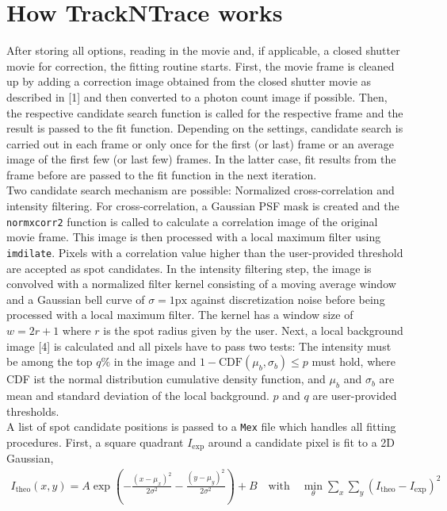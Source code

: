 \documentclass[11pt,onside]{report}
\numberwithin{equation}{chapter}
\begin{document}
\section{How TrackNTrace works}\label{sec:in-depth}
After storing all options, reading in the movie and, if applicable, a closed shutter movie for correction, the fitting routine starts. First, the movie frame is cleaned up by adding a correction image obtained from the closed shutter movie as described in [1] and then converted to a photon count image if possible. Then, the respective candidate search function is called for the respective frame and the result is passed to the fit function. Depending on the settings, candidate search is carried out in each frame or only once for the first (or last) frame or an average image of the first few (or last few) frames. In the latter case, fit results from the frame before are passed to the fit function in the next iteration. \\
Two candidate search mechanism are possible: Normalized cross-correlation and intensity filtering. For cross-correlation, a Gaussian PSF mask is created and the \texttt{normxcorr2} function is called to calculate a correlation image of the original movie frame. This image is then processed with a local maximum filter using \texttt{imdilate}. Pixels with a correlation value higher than the user-provided threshold are accepted as spot candidates. In the intensity filtering step, the image is convolved with a normalized filter kernel  consisting of a moving average window and a Gaussian bell curve of $\sigma = \unit{1}{\mathrm{px}}$ against discretization noise before being processed with a local maximum filter. The kernel has a window size of $w = 2r+1$ where $r$ is the spot radius given by the user. Next, a local background image [4] is calculated and all pixels have to pass two tests: The intensity must be among the top $q\%$ in the image and $1-\mathrm{CDF}(\mu_b,\sigma_b) \leq p$ must hold, where CDF ist the normal distribution cumulative density function, and $\mu_b$ and $\sigma_b$ are mean and standard deviation of the local background. $p$ and $q$ are user-provided thresholds.\\[10pt]
A list of spot candidate positions is passed to a \texttt{Mex} file which handles all fitting procedures. First, a square quadrant $I_\mathrm{exp}$ around a candidate pixel is fit to a 2D Gaussian,
\begin{align*}
I_\mathrm{theo}(x,y) = A\exp\left(-\frac{(x-\mu_x)^2}{2\sigma^2} - \frac{(y-\mu_y)^2}{2\sigma^2}\right) + B \quad\mathrm{with}\quad \min_\theta \sum_x\sum_y \left(I_\mathrm{theo}-I_\mathrm{exp}\right)^2
\end{align*}
\end{document}
